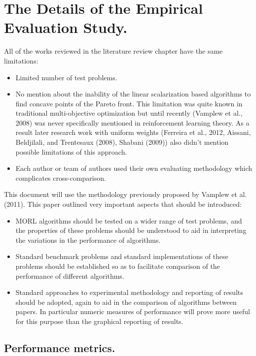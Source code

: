 \section{The Details of the Empirical Evaluation Study.}

All of the works reviewed in the literature review chapter have the same limitations:
\begin{itemize}
  \item Limited number of test problems.
  \item No mention about the inability of the linear scalarization based algorithms to find concave points of the Pareto front. This limitation was quite known in traditional multi-objective optimization but until recently (Vamplew et al., 2008\nocite{vamplew2008limitations}) was never specifically mentioned in reinforcement learning theory. As a result later research work with uniform weights (Ferreira et al., 2012\nocite{F6363312}, Aissani, Beldjilali, and Trentesaux (2008)\nocite{aissani2008use}, Shabani (2009)\nocite{shabani2009incorporating}) also didn't mention possible limitations of this approach.
  \item Each author or team of authors used their own evaluating methodology which complicates cross-comparison.
\end{itemize}


This document will use the methodology previously proposed by Vamplew et al. (2011)\cite{vamplew2011empirical}. This paper outlined very important aspects that should be introduced:
\begin{itemize}
  \item MORL algorithms should be tested on a wider range of test problems, and the properties of these problems should be understood to aid in interpreting the variations in the performance of algorithms.
  \item Standard benchmark problems and standard implementations of these problems should be established so as to facilitate comparison of the performance of different algorithms.
  \item Standard approaches to experimental methodology and reporting of results should be adopted, again to aid in the comparison of algorithms between papers. In particular numeric measures of performance will prove more useful for this purpose than the graphical reporting of results.
\end{itemize}

\subsection{Performance metrics.}


